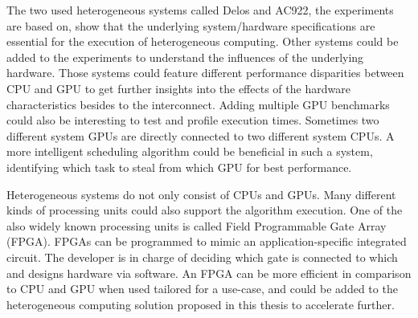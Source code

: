 The two used heterogeneous systems called Delos and AC922, the experiments are based on, show that the underlying system/hardware specifications are essential for the execution of heterogeneous computing. Other systems could be added to the experiments to understand the influences of the underlying hardware. Those systems could feature different performance disparities between CPU and GPU to get further insights into the effects of the hardware characteristics besides to the interconnect. Adding multiple GPU benchmarks could also be interesting to test and profile execution times. Sometimes two different system GPUs are directly connected to two different system CPUs. A more intelligent scheduling algorithm could be beneficial in such a system, identifying which task to steal from which GPU for best performance.

Heterogeneous systems do not only consist of CPUs and GPUs. Many different kinds of processing units could also support the algorithm execution. One of the also widely known processing units is called Field Programmable Gate Array (FPGA). FPGAs can be programmed to mimic an application-specific integrated circuit. The developer is in charge of deciding which gate is connected to which and designs hardware via software. An FPGA can be more efficient in comparison to CPU and GPU when used tailored for a use-case, \cite{qasaimehComparingEnergyEfficiency2019} and could be added to the heterogeneous computing solution proposed in this thesis to accelerate further.
% 